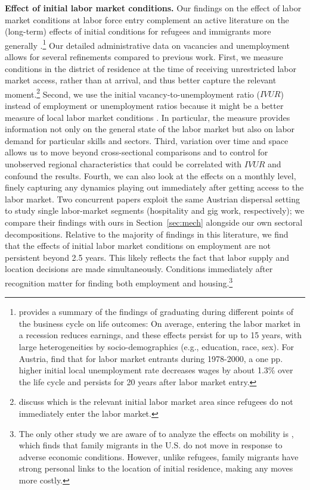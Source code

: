 \textbf{Effect of initial labor market conditions.} Our findings on the effect of labor market conditions at labor force entry complement an active literature on the (long-term) effects of initial conditions for refugees \citep{aslund_when_2007, godoy_local_2017, fasani_struggle_2022, aksoy_first_2023} and immigrants more generally \citep{chiswick1997, chiswick2002, barsbai2024}.\footnote{\citet{von_wachter_persistent_2020} provides a summary of the findings of graduating during different points of the business cycle on life outcomes: On average, entering the labor market in a recession reduces earnings, and these effects persist for up to 15 years, with large heterogeneities by socio-demographics (e.g., education, race, sex). For Austria, \citet{brunner_impact_2014} find that for labor market entrants during 1978-2000, a one pp. higher initial local unemployment rate decreases wages by about 1.3\% over the life cycle and persists for 20 years after labor market entry.} Our detailed administrative data on vacancies and unemployment allows for several refinements compared to previous work. First, we measure conditions in the district of residence at the time of receiving unrestricted labor market access, rather than at arrival, and thus better capture the relevant moment.\footnote{\citet{aslund_when_2007} discuss which is the relevant initial labor market area since refugees do not immediately enter the labor market.} Second, we use the initial vacancy-to-unemployment ratio ($IVUR$) instead of employment or unemployment ratios because it might be a better measure of local labor market conditions \citep{dustmann2024}. In particular, the measure provides information not only on the general state of the labor market but also on labor demand for particular skills and sectors. Third, variation over time and space allows us to move beyond cross-sectional comparisons and to control for unobserved regional characteristics that could be correlated with $IVUR$ and confound the results. Fourth, we can also look at the effects on a monthly level, finely capturing any dynamics playing out immediately after getting access to the labor market. Two concurrent papers \citep{degenhardt2025initial, degenhardt2025} exploit the same Austrian dispersal setting to study single labor-market segments (hospitality and gig work, respectively); we compare their findings with ours in Section~\ref{sec:mech} alongside our own sectoral decompositions.
Relative to the majority of findings in this literature, we find that the effects of initial labor market conditions on employment are not persistent beyond 2.5 years. This likely reflects the fact that labor supply and location decisions are made simultaneously. Conditions immediately after recognition matter for finding both employment and housing.\footnote{The only other study we are aware of to analyze the effects on mobility is \citet{barsbai2024}, which finds that family migrants in the U.S. do not move in response to adverse economic conditions. However, unlike refugees, family migrants have strong personal links to the location of initial residence, making any moves more costly.}
